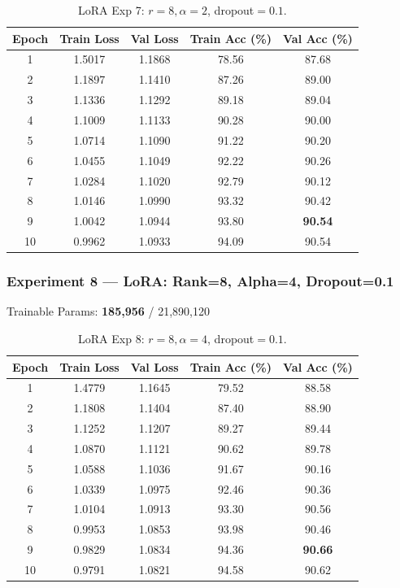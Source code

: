 \documentclass[11pt,a4paper]{article}
\begin{document}
\begin{table}[H]
\centering
\begin{tabular}{@{}ccccc@{}}
\toprule
\textbf{Epoch} & \textbf{Train Loss} & \textbf{Val Loss} & \textbf{Train Acc (\%)} & \textbf{Val Acc (\%)} \\
\midrule
1  & 1.5017 & 1.1868 & 78.56 & 87.68 \\
2  & 1.1897 & 1.1410 & 87.26 & 89.00 \\
3  & 1.1336 & 1.1292 & 89.18 & 89.04 \\
4  & 1.1009 & 1.1133 & 90.28 & 90.00 \\
5  & 1.0714 & 1.1090 & 91.22 & 90.20 \\
6  & 1.0455 & 1.1049 & 92.22 & 90.26 \\
7  & 1.0284 & 1.1020 & 92.79 & 90.12 \\
8  & 1.0146 & 1.0990 & 93.32 & 90.42 \\
9  & 1.0042 & 1.0944 & 93.80 & \textbf{90.54} \\
10 & 0.9962 & 1.0933 & 94.09 & 90.54 \\
\bottomrule
\end{tabular}
\caption{LoRA Exp 7: $r=8, \alpha=2$, dropout$=0.1$.}
\end{table}

\subsubsection*{Experiment 8 — LoRA: Rank=8, Alpha=4, Dropout=0.1}
\begin{center}
\small Trainable Params: \textbf{185,956} / 21,890,120
\end{center}

\begin{table}[H]
\centering
\begin{tabular}{@{}ccccc@{}}
\toprule
\textbf{Epoch} & \textbf{Train Loss} & \textbf{Val Loss} & \textbf{Train Acc (\%)} & \textbf{Val Acc (\%)} \\
\midrule
1  & 1.4779 & 1.1645 & 79.52 & 88.58 \\
2  & 1.1808 & 1.1404 & 87.40 & 88.90 \\
3  & 1.1252 & 1.1207 & 89.27 & 89.44 \\
4  & 1.0870 & 1.1121 & 90.62 & 89.78 \\
5  & 1.0588 & 1.1036 & 91.67 & 90.16 \\
6  & 1.0339 & 1.0975 & 92.46 & 90.36 \\
7  & 1.0104 & 1.0913 & 93.30 & 90.56 \\
8  & 0.9953 & 1.0853 & 93.98 & 90.46 \\
9  & 0.9829 & 1.0834 & 94.36 & \textbf{90.66} \\
10 & 0.9791 & 1.0821 & 94.58 & 90.62 \\
\bottomrule
\end{tabular}
\caption{LoRA Exp 8: $r=8, \alpha=4$, dropout$=0.1$.}
\end{table}
\end{document}
